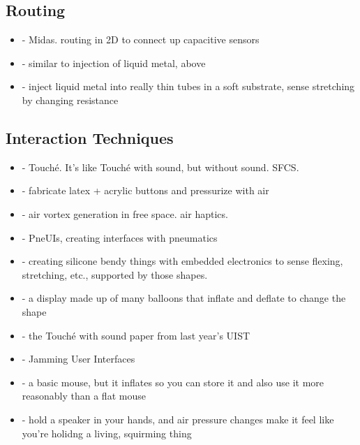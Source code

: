\subsection{Routing}
\begin{itemize}
\item \cite{Savage-midas} - Midas.  routing in 2D to connect up capacitive sensors
\item \cite{Park-microchannels} - similar to injection of liquid metal, above
\item \cite{Majidi-curvature} - inject liquid metal into really thin tubes in a soft substrate, sense stretching by changing resistance
\end{itemize}

\subsection{Interaction Techniques}
\begin{itemize}
\item \cite{Sato-touche} - Touch\'{e}.  It's like Touch\'{e} with sound, but without sound.  SFCS.
\item \cite{Harrison-buttons} - fabricate latex + acrylic buttons and pressurize with air
\item \cite{Sodhi-aireal} - air vortex generation in free space.  air haptics.
\item \cite{Yao-pneui} - PneUIs, creating interfaces with pneumatics
\item \cite{Slyper-shape} - creating silicone bendy things with embedded electronics to sense flexing, stretching, etc., supported by those shapes.
\item \cite{Iwata-volflex} - a display made up of many balloons that inflate and deflate to change the shape
\item \cite{Ono-touchandactivate} - the Touch\'{e} with sound paper from last year's UIST
\item \cite{Follmer-jamming} - Jamming User Interfaces
\item \cite{Kim-inflatablemouse} - a basic mouse, but it inflates so you can store it and also use it more reasonably than a flat mouse
\item \cite{Hashimoto-squirming} - hold a speaker in your hands, and air pressure changes make it feel like you're holidng a living, squirming thing
\end{itemize}